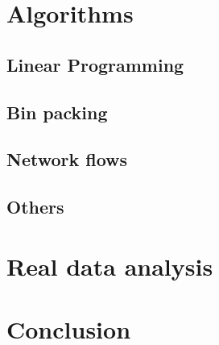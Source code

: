 \documentclass[a4paper,11pt]{article}
\begin{document}
\section{Algorithms}

\subsection{Linear Programming}

\subsection{Bin packing}

\subsection{Network flows}

\subsection{Others}

\section{Real data analysis}

\section*{Conclusion}

\nocite{*}


\end{document}
